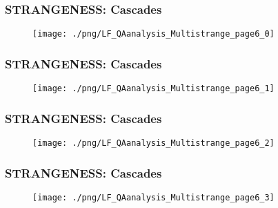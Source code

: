 \documentclass{beamer}
\begin{document}
{{    \begin{frame}
    \frametitle{STRANGENESS: Cascades}
      \begin{figure}
      \texttt{[image: ./png/LF\_QAanalysis\_Multistrange\_page6\_0]}
      \end{figure}
    \end{frame}
    \begin{frame}
    \frametitle{STRANGENESS: Cascades}
      \begin{figure}
      \texttt{[image: ./png/LF\_QAanalysis\_Multistrange\_page6\_1]}
      \end{figure}
    \end{frame}
    \begin{frame}
    \frametitle{STRANGENESS: Cascades}
      \begin{figure}
      \texttt{[image: ./png/LF\_QAanalysis\_Multistrange\_page6\_2]}
      \end{figure}
    \end{frame}
    \begin{frame}
    \frametitle{STRANGENESS: Cascades}
      \begin{figure}
      \texttt{[image: ./png/LF\_QAanalysis\_Multistrange\_page6\_3]}
      \end{figure}
    \end{frame}
  }
}
\end{document}
